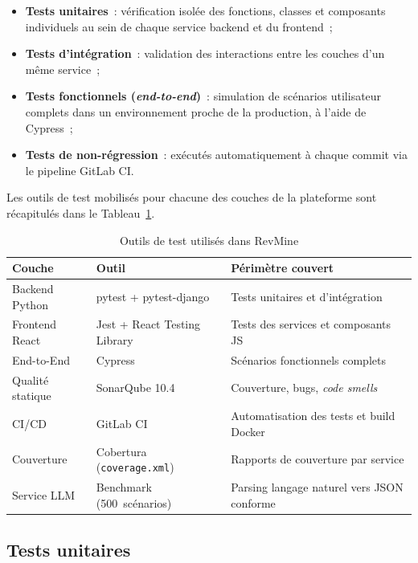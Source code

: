 \begin{itemize}
    \item \textbf{Tests unitaires}~: vérification isolée des fonctions, classes et composants
          individuels au sein de chaque service backend et du frontend~;
    \item \textbf{Tests d'intégration}~: validation des interactions entre les couches d'un même
          service~;
    \item \textbf{Tests fonctionnels (\textit{end-to-end})}~: simulation de scénarios utilisateur
          complets dans un environnement proche de la production, à l'aide de Cypress~;
    \item \textbf{Tests de non-régression}~: exécutés automatiquement à chaque commit via le
          pipeline GitLab CI.
\end{itemize}

Les outils de test mobilisés pour chacune des couches de la plateforme sont récapitulés dans le
Tableau~\ref{tab:outils-tests}.

\begin{table}[H]
\centering
\small
\caption{Outils de test utilisés dans RevMine}
\label{tab:outils-tests}
\begin{tabular}{|>{\raggedright\arraybackslash}p{3.5cm}
                |>{\raggedright\arraybackslash}p{3.8cm}
                |>{\raggedright\arraybackslash}p{5.5cm}|}
\hline
\textbf{Couche} & \textbf{Outil} & \textbf{Périmètre couvert} \\
\hline
Backend Python & pytest + pytest-django & Tests unitaires et d'intégration \\
\hline
Frontend React & Jest + React Testing Library & Tests des services et composants JS \\
\hline
End-to-End & Cypress & Scénarios fonctionnels complets \\
\hline
Qualité statique & SonarQube 10.4 & Couverture, bugs, \textit{code smells} \\
\hline
CI/CD & GitLab CI & Automatisation des tests et build Docker \\
\hline
Couverture & Cobertura (\texttt{coverage.xml}) & Rapports de couverture par service \\
\hline
Service LLM & Benchmark (500~scénarios) & Parsing langage naturel vers JSON conforme \\
\hline
\end{tabular}
\end{table}

\subsection{Tests unitaires}


